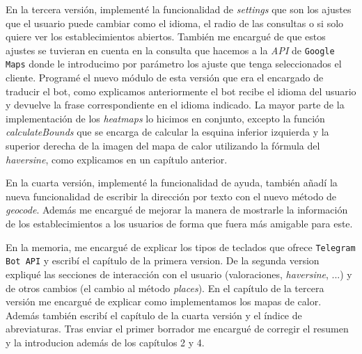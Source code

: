 \documentclass[oneside]{memoir}
\begin{document}
En la tercera versión, implementé la funcionalidad de \textit{settings} que son los ajustes que el usuario puede cambiar como el idioma, el radio de las consultas o si solo quiere ver los establecimientos abiertos. También me encargué de que estos ajustes se tuvieran en cuenta en la consulta que hacemos a la \textit{API} de \texttt{Google Maps} donde le introducimo por parámetro los ajuste que tenga seleccionados el cliente. Programé el nuevo módulo de esta versión que era el encargado de traducir el bot, como explicamos anteriormente el bot recibe el idioma del usuario y devuelve la frase correspondiente en el idioma indicado. La mayor parte de la implementación de los \textit{heatmaps} lo hicimos en conjunto, excepto la función \textit{calculateBounds} que se encarga de calcular la esquina inferior izquierda y la superior derecha de la imagen del mapa de calor utilizando la fórmula del \textit{haversine}, como explicamos en un capítulo anterior.

En la cuarta versión, implementé la funcionalidad de ayuda, también añadí la nueva funcionalidad de escribir la dirección por texto con el nuevo método de \textit{geocode}. Además me encargué de mejorar la manera de mostrarle la información de los establecimientos a los usuarios de forma que fuera más amigable para este.

En la memoria, me encargué de explicar los tipos de teclados que ofrece \texttt{Telegram Bot API} y escribí el capítulo de la primera version. De la segunda version expliqué las secciones de interacción con el usuario (valoraciones, \textit{haversine}, ...) y de otros cambios (el cambio al método \textit{places}). En el capítulo de la tercera versión me encargué de explicar como implementamos los mapas de calor. Además también escribí el capítulo de la cuarta versión y el índice de abreviaturas. Tras enviar el primer borrador me encargué de corregir el resumen y la introducion además de los capítulos 2 y 4.
\end{document}
